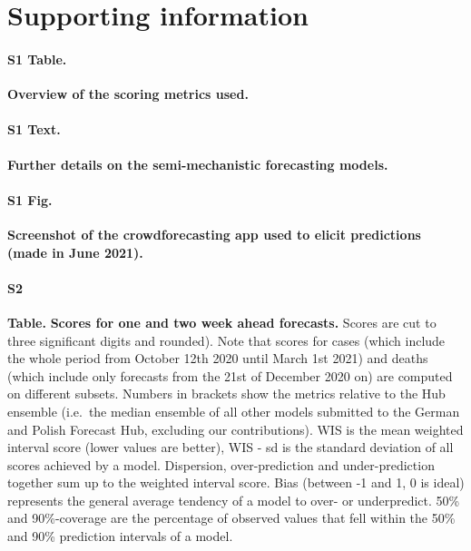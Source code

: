 \documentclass[10pt,letterpaper]{article}
\renewcommand{\figurename}{Fig}
\newcommand{\beginsupplement}{\setcounter{table}{0}  \renewcommand{\thetable}{S\arabic{table}}
\newfloat{text}{thp}{}
\floatname{text}{Text}
\renewcommand{\figurename}{}
\newcommand{\newfigurename}{Hello}
\setcounter{figure}{0} \renewcommand{\thefigure}{S\arabic{figure}}}
\begin{document}
\clearpage

\beginsupplement

\section*{Supporting information}

\paragraph*{S1 Table.}
\label{tab:scoring-metrics}

\textbf{Overview of the scoring metrics used.}

\paragraph*{S1 Text.}
\label{txt:details-models}

\textbf{Further details on the semi-mechanistic forecasting models.}

\paragraph*{S1 Fig.}
\label{fig:screenshot}

\textbf{Screenshot of the crowdforecasting app used to elicit predictions (made in June 2021).}

\paragraph*{S2}

\textbf{Table.} \label{tab:score-table-2}
\textbf{Scores for one and two week ahead forecasts.} Scores are cut to
three significant digits and rounded). Note that scores for cases (which
include the whole period from October 12th 2020 until March 1st 2021)
and deaths (which include only forecasts from the 21st of December 2020
on) are computed on different subsets. Numbers in brackets show the
metrics relative to the Hub ensemble (i.e.~the median ensemble of all
other models submitted to the German and Polish Forecast Hub, excluding
our contributions). WIS is the mean weighted interval score (lower
values are better), WIS - sd is the standard deviation of all scores
achieved by a model. Dispersion, over-prediction and under-prediction
together sum up to the weighted interval score. Bias (between -1 and 1,
0 is ideal) represents the general average tendency of a model to over-
or underpredict. 50\% and 90\%-coverage are the percentage of observed
values that fell within the 50\% and 90\% prediction intervals of a
model.
\end{document}
